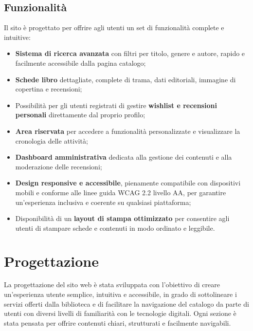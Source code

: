 \documentclass{article}
\begin{document}
\subsection{Funzionalità}
Il sito è progettato per offrire agli utenti un set di funzionalità complete e intuitive:
\begin{itemize}
    \item \textbf{Sistema di ricerca avanzata} con filtri per titolo, genere e autore, rapido e facilmente accessibile dalla pagina catalogo;
    \item \textbf{Schede libro} dettagliate, complete di trama, dati editoriali, immagine di copertina e recensioni;
    \item Possibilità per gli utenti registrati di gestire \textbf{wishlist e recensioni personali} direttamente dal proprio profilo;
    \item \textbf{Area riservata} per accedere a funzionalità personalizzate e visualizzare la cronologia delle attività;
    \item \textbf{Dashboard amministrativa} dedicata alla gestione dei contenuti e alla moderazione delle recensioni;
    \item \textbf{Design responsive e accessibile}, pienamente compatibile con dispositivi mobili e conforme alle linee guida WCAG 2.2 livello AA, per garantire un'esperienza inclusiva e coerente su qualsiasi piattaforma;
    \item Disponibilità di un \textbf{layout di stampa ottimizzato} per consentire agli utenti di stampare schede e contenuti in modo ordinato e leggibile.
\end{itemize}


\section{Progettazione}
La progettazione del sito web è stata sviluppata con l'obiettivo di creare un'esperienza utente semplice, intuitiva e accessibile, in grado di sottolineare i servizi offerti dalla biblioteca e di facilitare la navigazione del catalogo da parte di utenti con diversi livelli di familiarità con le tecnologie digitali.
Ogni sezione è stata pensata per offrire contenuti chiari, strutturati e facilmente navigabili.
\end{document}
